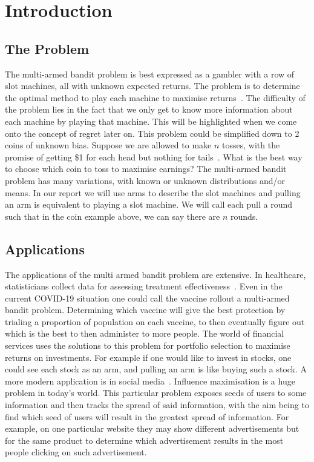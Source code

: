 \section{Introduction}\label{sec:introduction}

\subsection{The Problem}\label{subsec:the-problem}
The multi-armed bandit problem is best expressed as a gambler with a row of slot machines, all with unknown expected returns.
The problem is to determine the optimal method to play each machine to maximise returns~\citep{vermorel}.
The difficulty of the problem lies in the fact that we only get to know more information about each machine by playing that machine.
This will be highlighted when we come onto the concept of regret later on.
\newline
\newline
This problem could be simplified down to 2 coins of unknown bias.
Suppose we are allowed to make $n$ tosses, with the promise of getting \$1 for each head but nothing for tails~\citep{robbins1952some}.
What is the best way to choose which coin to toss to maximise earnings?
The multi-armed bandit problem has many variations, with known or unknown distributions and/or means.
\newline
\newline
In our report we will use arms to describe the slot machines and pulling an arm is equivalent to playing a slot machine.
We will call each pull a round such that in the coin example above, we can say there are $n$ rounds.

\subsection{Applications}\label{subsec:applications}
The applications of the multi armed bandit problem are extensive.
In healthcare, statisticians collect data for assessing treatment effectiveness~\citep{bouneffouf2019survey}.
Even in the current COVID-19 situation one could call the vaccine rollout a multi-armed bandit problem.
Determining which vaccine will give the best protection by trialing a proportion of population on each vaccine, to then eventually figure out which is the best to then administer to more people.
The world of financial services uses the solutions to this problem for portfolio selection to maximise returns on investments.
For example if one would like to invest in stocks, one could see each stock as an arm, and pulling an arm is like buying such a stock.
\newline
\newline
A more modern application is in social media~\citep{chen2013combinatorial}.
Influence maximisation is a huge problem in today's world.
This particular problem exposes seeds of users to some information and then tracks the spread of said information, with the aim being to find which seed of users will result in the greatest spread of information.
For example, on one particular website they may show different advertisements but for the same product to determine which advertisement results in the most people clicking on such advertisement.

